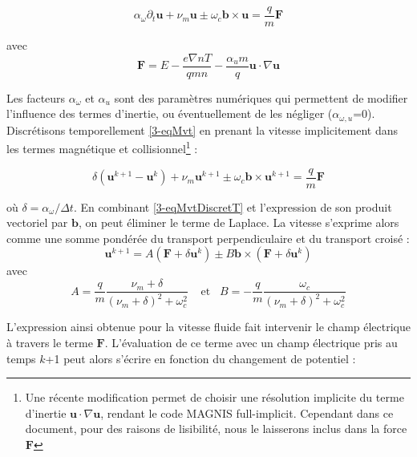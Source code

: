 \begin{refsection}
\begin{equation}
\label{3-eqMvt}
\alpha_\omega\partial_t \mathbf{u} + 
\nu_m\mathbf{u}\pm\omega_{c}\mathbf{b}\times\mathbf{u}=
\frac{q}{m}\mathbf F
\end{equation}

avec 
\begin{equation*}\mathbf F=E-\frac{e\nabla
n T}{qm
n}-\frac{\alpha_um}{q}\mathbf{u}\cdot\nabla\mathbf{u}
\end{equation*}

Les facteurs $\alpha_\omega$ et $\alpha_u$ sont des paramètres numériques qui
permettent de modifier l'influence des termes d'inertie, ou éventuellement de
les négliger ($\alpha_{\omega,u}$=0). Discrétisons temporellement
\eqref{3-eqMvt} en prenant la vitesse implicitement dans les termes
magnétique et collisionnel\footnote{Une récente modification permet de choisir
une résolution implicite du terme
d'inertie $\mathbf{u}\cdot\nabla\mathbf{u}$, rendant le code MAGNIS
full-implicit. Cependant dans ce document, pour des raisons de lisibilité, nous
le laisserons inclus dans la force $\mathbf F$} :

\begin{equation}
\label{3-eqMvtDiscretT}
\delta\left(\mathbf{u}^{k+1}-\mathbf{u}^{k}\right) + 
\nu_m\mathbf{u}^{k+1}\pm\omega_{c}\mathbf{b}\times\mathbf{u}^{k+1}=
\frac{q}{m}\mathbf F
\end{equation}

où $\delta=\alpha_\omega/\Delta t$. En combinant \ref{3-eqMvtDiscretT} et
l'expression de son produit vectoriel par $\mathbf b$, on peut éliminer le
terme de Laplace. La vitesse s'exprime alors comme une somme pondérée du
transport perpendiculaire et du transport croisé :
\begin{equation}
\label{3-eqMvtPonderee}
\mathbf{u}^{k+1}=A\left(\mathbf F + \delta\mathbf{u}^{k}\right)\pm B\mathbf
b\times\left(\mathbf F + \delta\mathbf{u}^{k}\right)
\end{equation}
avec 
\begin{equation*}
\label{3-coefficientsVitesses}
A=\frac{q}{m}\frac{\nu_m+\delta}{(\nu_m+\delta)^2+\omega_c^2}\;\;\;\;\text{et}\;\;\;B=-\frac{q}{m}\frac{\omega_c}{(\nu_m+\delta)^2+\omega_c^2}
\end{equation*}

L'expression ainsi obtenue pour la vitesse
fluide fait intervenir le champ électrique à travers le terme $\mathbf F$.
L'évaluation de ce terme avec un champ électrique pris au temps $k$+1 peut alors
s'écrire en fonction du changement de potentiel :


\end{refsection}
